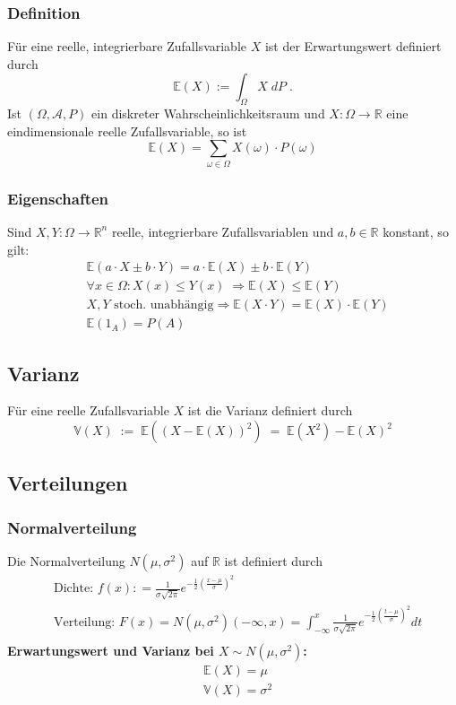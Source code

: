 \documentclass[a4paper]{article}
\begin{document}
\subsubsection{Definition}
Für eine reelle, integrierbare Zufallsvariable $X$ ist der Erwartungswert definiert durch
$$ \mathbb{E} (X) := \int_{\Omega} X \; dP \; .$$
Ist $(\Omega, \mathcal{A}, P)$ ein diskreter Wahrscheinlichkeitsraum und $X :\Omega \to \mathbb{R}$ eine eindimensionale reelle Zufallsvariable, so ist
$$ \mathbb{E} (X) = \sum_{\omega \in \Omega}  X(\omega) \cdot P(\omega)$$

\subsubsection{Eigenschaften}
Sind $X,Y : \Omega \to \mathbb{R}^n$   reelle, integrierbare  Zufallsvariablen und $a,b \in \mathbb{R}$ konstant, so gilt:
\begin{align*}
& \mathbb{E}(a \cdot X \pm b \cdot Y) = a \cdot \mathbb{E}(X) \pm b \cdot \mathbb{E}(Y) \\
& \forall x \in \Omega: X(x) \leq Y(x) \;   \Rightarrow \mathbb{E}(X) \leq \mathbb{E}(Y) \\
& X ,Y \text{ stoch. unabhängig} \Rightarrow   \mathbb{E}(X \cdot Y) =  \mathbb{E}(X) \cdot  \mathbb{E}(Y) \\
& \mathbb{E} (1_A) = P (A)
\end{align*}

\subsection{Varianz}
Für eine reelle Zufallsvariable $X$ ist die Varianz definiert durch
$$ \mathbb{V} (X) \; := \;  \mathbb{E}( (X - \mathbb{E}(X))^2) \;  = \; \mathbb{E}(X^2) -  \mathbb{E}(X)^2$$

\pagebreak
\subsection{Verteilungen}

\subsubsection{Normalverteilung}
Die Normalverteilung $N{(\mu,\sigma^2)}$ auf $\mathbb{R}$ ist definiert durch
\begin{align*}
& \text{Dichte: } f (x) : = \frac 1{\sigma \sqrt{2\pi}}e^{- \frac {1}{2} (\frac{x- \mu}{ \sigma})^2} \\
&  \text{Verteilung: } F(x) = N{(\mu,\sigma^2)}(-\infty , x) =  \int_{-\infty}^{x}  \frac 1{\sigma \sqrt{2\pi}}e^{- \frac {1}{2} (\frac{t- \mu}{ \sigma})^2}dt\\
\end{align*}
\textbf{Erwartungswert und Varianz bei $X \sim N(\mu, \sigma^2)$:}
\begin{align*}
& \mathbb{E}(X) = \mu \\
& \mathbb{V}(X) = \sigma^2
\end{align*}
\end{document}
